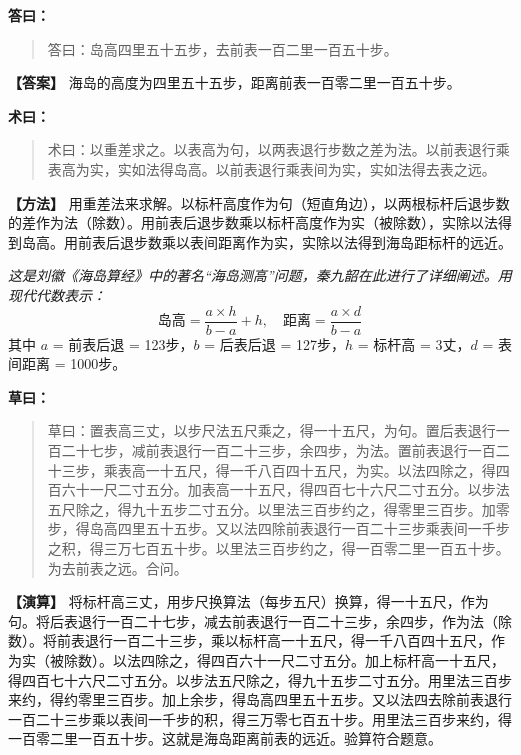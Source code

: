 \documentclass[11pt,a4paper]{article}
\newcommand{\dalabel}{\textbf{\color{origcolor}答曰：}}
\newcommand{\shulabel}{\textbf{\color{origcolor}术曰：}}
\newcommand{\caolabel}{\textbf{\color{origcolor}草曰：}}
\newcommand{\moddalabel}{\textbf{\color{modcolor}【答案】}}
\newcommand{\modshulabel}{\textbf{\color{modcolor}【方法】}}
\newcommand{\modcaolabel}{\textbf{\color{modcolor}【演算】}}
\begin{document}
\begin{originaltext}
\dalabel
\begin{quote}
\textcolor{origcolor}{%
答曰：岛高四里五十五步，去前表一百二里一百五十步。
}
\end{quote}
\end{originaltext}

\begin{moderntext}
\moddalabel
海岛的高度为四里五十五步，距离前表一百零二里一百五十步。
\end{moderntext}

\begin{originaltext}
\shulabel
\begin{quote}
\textcolor{origcolor}{%
术曰：以重差求之。以表高为句，以两表退行步数之差为法。以前表退行乘表高为实，实如法得岛高。以前表退行乘表间为实，实如法得去表之远。
}
\end{quote}
\end{originaltext}

\begin{moderntext}
\modshulabel
用重差法来求解。以标杆高度作为句（短直角边），以两根标杆后退步数的差作为法（除数）。用前表后退步数乘以标杆高度作为实（被除数），实除以法得到岛高。用前表后退步数乘以表间距离作为实，实除以法得到海岛距标杆的远近。

\textit{这是刘徽《海岛算经》中的著名``海岛测高''问题，秦九韶在此进行了详细阐述。用现代代数表示：}
\[
\text{岛高} = \frac{a \times h}{b - a} + h, \quad
\text{距离} = \frac{a \times d}{b - a}
\]
其中 $a$ = 前表后退 = 123步，$b$ = 后表后退 = 127步，$h$ = 标杆高 = 3丈，$d$ = 表间距离 = 1000步。
\end{moderntext}

\begin{originaltext}
\caolabel
\begin{quote}
\textcolor{origcolor}{%
草曰：置表高三丈，以步尺法五尺乘之，得一十五尺，为句。置后表退行一百二十七步，减前表退行一百二十三步，余四步，为法。置前表退行一百二十三步，乘表高一十五尺，得一千八百四十五尺，为实。以法四除之，得四百六十一尺二寸五分。加表高一十五尺，得四百七十六尺二寸五分。以步法五尺除之，得九十五步二寸五分。以里法三百步约之，得零里三百步。加零步，得岛高四里五十五步。又以法四除前表退行一百二十三步乘表间一千步之积，得三万七百五十步。以里法三百步约之，得一百零二里一百五十步。为去前表之远。合问。
}
\end{quote}
\end{originaltext}

\begin{moderntext}
\modcaolabel
将标杆高三丈，用步尺换算法（每步五尺）换算，得一十五尺，作为句。将后表退行一百二十七步，减去前表退行一百二十三步，余四步，作为法（除数）。将前表退行一百二十三步，乘以标杆高一十五尺，得一千八百四十五尺，作为实（被除数）。以法四除之，得四百六十一尺二寸五分。加上标杆高一十五尺，得四百七十六尺二寸五分。以步法五尺除之，得九十五步二寸五分。用里法三百步来约，得约零里三百步。加上余步，得岛高四里五十五步。又以法四去除前表退行一百二十三步乘以表间一千步的积，得三万零七百五十步。用里法三百步来约，得一百零二里一百五十步。这就是海岛距离前表的远近。验算符合题意。
\end{moderntext}
\end{document}
